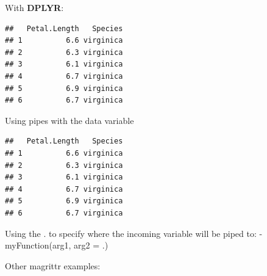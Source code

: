 \documentclass[]{book}
\newenvironment{Shaded}{\begin{snugshade}}{\end{snugshade}}
\newcommand{\DecValTok}[1]{\textcolor[rgb]{0.00,0.00,0.81}{#1}}
\newcommand{\KeywordTok}[1]{\textcolor[rgb]{0.13,0.29,0.53}{\textbf{#1}}}
\newcommand{\NormalTok}[1]{#1}
\newcommand{\OperatorTok}[1]{\textcolor[rgb]{0.81,0.36,0.00}{\textbf{#1}}}
\newcommand{\StringTok}[1]{\textcolor[rgb]{0.31,0.60,0.02}{#1}}
\begin{document}
With \textbf{DPLYR}:

\begin{Shaded}
\end{Shaded}

\begin{verbatim}
##   Petal.Length   Species
## 1          6.6 virginica
## 2          6.3 virginica
## 3          6.1 virginica
## 4          6.7 virginica
## 5          6.9 virginica
## 6          6.7 virginica
\end{verbatim}

Using pipes with the data variable

\begin{Shaded}
\end{Shaded}

\begin{verbatim}
##   Petal.Length   Species
## 1          6.6 virginica
## 2          6.3 virginica
## 3          6.1 virginica
## 4          6.7 virginica
## 5          6.9 virginica
## 6          6.7 virginica
\end{verbatim}

Using the . to specify where the incoming variable will be piped to:
- myFunction(arg1, arg2 = .)

\begin{Shaded}
\end{Shaded}

Other magrittr examples:
\end{document}
